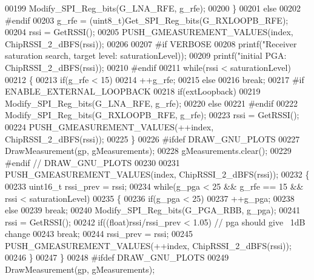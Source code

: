 \begin{DoxyCode}
{{{00199         Modify_SPI_Reg_bits(G_LNA_RFE, g\_rfe);
00200     \}
00201     \textcolor{keywordflow}{else}
00202 \textcolor{preprocessor}{#endif}
00203         g\_rfe = (uint8\_t)Get_SPI_Reg_bits(G_RXLOOPB_RFE);
00204     rssi = GetRSSI();
00205     PUSH_GMEASUREMENT_VALUES(index, ChipRSSI\_2\_dBFS(rssi));
00206 
00207 \textcolor{preprocessor}{#if VERBOSE}
00208     printf(\textcolor{stringliteral}{"Receiver saturation search, target level: %
      saturationLevel));
00209     printf(\textcolor{stringliteral}{"initial  PGA: %
      ChipRSSI\_2\_dBFS(rssi));
00210 \textcolor{preprocessor}{#endif}
00211     \textcolor{keywordflow}{while}(rssi < saturationLevel)
00212     \{
00213         \textcolor{keywordflow}{if}(g\_rfe < 15)
00214             ++g\_rfe;
00215         \textcolor{keywordflow}{else}
00216             \textcolor{keywordflow}{break};
00217 \textcolor{preprocessor}{#if ENABLE\_EXTERNAL\_LOOPBACK}
00218         \textcolor{keywordflow}{if}(extLoopback)
00219             Modify_SPI_Reg_bits(G_LNA_RFE, g\_rfe);
00220         \textcolor{keywordflow}{else}
00221 \textcolor{preprocessor}{#endif}
00222             Modify_SPI_Reg_bits(G_RXLOOPB_RFE, g\_rfe);
00223         rssi = GetRSSI();
00224         PUSH_GMEASUREMENT_VALUES(++index, ChipRSSI\_2\_dBFS(rssi));
00225     \}
00226 \textcolor{preprocessor}{#ifdef DRAW\_GNU\_PLOTS}
00227     DrawMeasurement(gp, gMeasurements);
00228     gMeasurements.clear();
00229 \textcolor{preprocessor}{#endif // DRAW\_GNU\_PLOTS}
00230 
00231     PUSH_GMEASUREMENT_VALUES(index, ChipRSSI\_2\_dBFS(rssi));
00232     \{
00233     uint16\_t rssi\_prev = rssi;
00234     \textcolor{keywordflow}{while}(g\_pga < 25 && g\_rfe == 15 && rssi < saturationLevel)
00235     \{
00236         \textcolor{keywordflow}{if}(g\_pga < 25)
00237             ++g\_pga;
00238         \textcolor{keywordflow}{else}
00239             \textcolor{keywordflow}{break};
00240         Modify_SPI_Reg_bits(G_PGA_RBB, g\_pga);
00241         rssi = GetRSSI();
00242         \textcolor{keywordflow}{if}((\textcolor{keywordtype}{float})rssi/rssi\_prev < 1.05) \textcolor{comment}{// pga should give ~1dB change}
00243             \textcolor{keywordflow}{break};
00244         rssi\_prev = rssi;
00245         PUSH_GMEASUREMENT_VALUES(++index, ChipRSSI\_2\_dBFS(rssi));
00246     \}
00247     \}
00248 \textcolor{preprocessor}{#ifdef DRAW\_GNU\_PLOTS}
00249     DrawMeasurement(gp, gMeasurements);
}}}}}
\end{DoxyCode}
